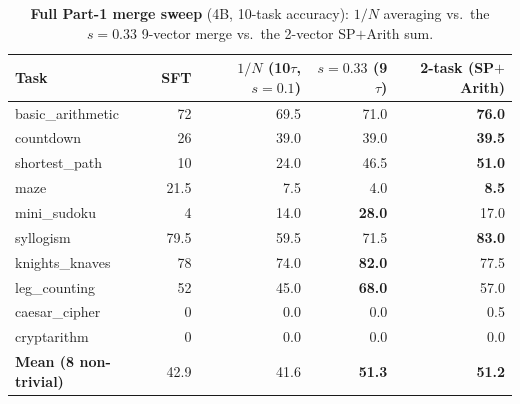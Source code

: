 \documentclass{article}
\newcommand{\tv}{\tau}
\begin{document}
\begin{table}[h]
\centering\small
\caption{\textbf{Full Part-1 merge sweep} (4B, 10-task accuracy): $1/N$ averaging vs.\ the
$s{=}0.33$ 9-vector merge vs.\ the 2-vector SP$+$Arith sum.}
\begin{tabular}{lrrrr}
\toprule
Task & SFT & $1/N$ (10$\tv$, $s{=}0.1$) & $s{=}0.33$ (9$\tv$) & 2-task (SP$+$Arith)\\
\midrule
basic\_arithmetic & 72   & 69.5 & 71.0 & \textbf{76.0}\\
countdown        & 26   & 39.0 & 39.0 & \textbf{39.5}\\
shortest\_path    & 10   & 24.0 & 46.5 & \textbf{51.0}\\
maze             & 21.5 & 7.5  & 4.0  & \textbf{8.5}\\
mini\_sudoku      & 4    & 14.0 & \textbf{28.0} & 17.0\\
syllogism        & 79.5 & 59.5 & 71.5 & \textbf{83.0}\\
knights\_knaves   & 78   & 74.0 & \textbf{82.0} & 77.5\\
leg\_counting     & 52   & 45.0 & \textbf{68.0} & 57.0\\
caesar\_cipher    & 0    & 0.0  & 0.0  & 0.5\\
cryptarithm      & 0    & 0.0  & 0.0  & 0.0\\
\midrule
\textbf{Mean (8 non-trivial)} & 42.9 & 41.6 & \textbf{51.3} & \textbf{51.2}\\
\bottomrule
\end{tabular}
\end{table}
\end{document}
